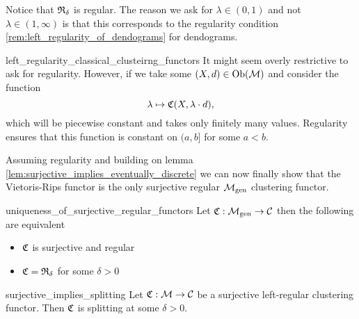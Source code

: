 Notice that $\mathfrak{R}_\delta$ is regular. The reason we ask for $\lambda \in (0,1)$ and not $\lambda \in (1, \infty)$ is that this corresponds to the regularity condition \ref{rem:left_regularity_of_dendograms} for dendograms.\par

\begin{myremark}{}{left_regularity_classical_clusteirng_functors}
    \medskip It might seem overly restrictive to ask for regularity.
    However, if we take some $(X, d) \in \mathrm {Ob}(\mathcal{M})$ and consider the function 
    $$
    \lambda \mapsto \mathfrak{C}(X, \lambda \cdot d),
    $$
    which will be piecewise constant and takes only finitely many values.
    Regularity ensures that this function is constant on $(a, b]$ for some $a < b$.
\end{myremark}

Assuming regularity and building on lemma \ref{lem:surjective_implies_eventually_discrete} we can now finally show that the Vietoris-Rips functor is the only surjective regular ${\mathcal{M}_\mathrm{gen}}$ clustering functor.

\begin{theorem}{}{uniqueness_of_surjective_regular_functors}
    Let $\mathfrak{C}: {\mathcal{M}_\mathrm{gen}} \to \mathcal{C}$ then the following are equivalent

    \begin{itemize}
        \item $\mathfrak{C}$ is surjective and regular
        \item $\mathfrak{C} = \mathfrak{R}_{\delta}$ for some $\delta > 0$
    \end{itemize}
\end{theorem}

\begin{lemma}{}{surjective_implies_splitting}
    Let $\mathfrak{C}: \mathcal{M} \to \mathcal{C}$ be a surjective left-regular clustering functor. Then $\mathfrak{C}$ is splitting at some $\delta > 0$.

\end{lemma}

